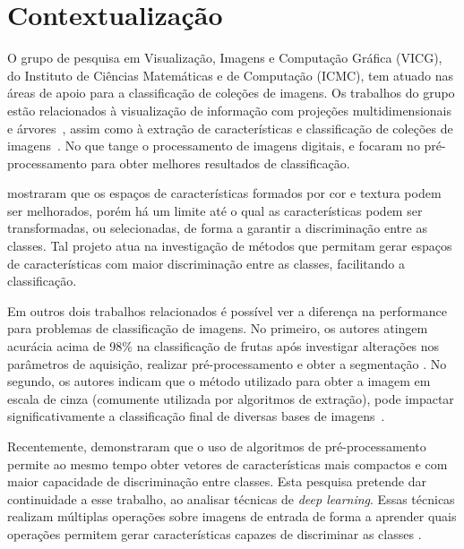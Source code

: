 \section{Contextualização}

O grupo de pesquisa em Visualização, Imagens e Computação Gráfica (VICG), do Instituto de Ciências Matemáticas e de Computação (ICMC), tem atuado nas áreas de apoio para a classificação de coleções de imagens. Os trabalhos do grupo estão relacionados à visualização de informação com projeções multidimensionais e árvores~\cite{Joia2011}, assim como à extração de características e classificação de coleções de imagens~\cite{Paiva2011}. No que tange o processamento de imagens digitais, \citet{Picon2011} e \citet{Ponti2013} focaram no pré-processamento para obter melhores resultados de classificação. 

\citet{Paiva2011} mostraram que os espaços de características formados por cor e textura podem ser melhorados, porém há um limite até o qual as características podem ser transformadas, ou selecionadas, de forma a garantir a discriminação entre as classes. Tal projeto atua na investigação de métodos que permitam gerar espaços de características com maior discriminação entre as classes, facilitando a classificação. 

Em outros dois trabalhos relacionados é possível ver a diferença na performance para problemas de classificação de imagens. No primeiro, os autores atingem acurácia acima de 98\% na classificação de frutas após investigar alterações nos parâmetros de aquisição, realizar pré-processamento e obter a segmentação \cite{Rocha2010}. No segundo, os autores indicam que o método utilizado para obter a imagem em escala de cinza (comumente utilizada por algoritmos de extração), pode impactar significativamente a classificação final de diversas bases de imagens~\cite{Kanan2012}.

Recentemente, \citet{Ponti2014} demonstraram que o uso de algoritmos de pré\hyp{}processamento permite ao mesmo tempo obter vetores de características mais compactos e com maior capacidade de discriminação entre classes. Esta pesquisa pretende dar continuidade a esse trabalho, ao analisar técnicas de \textit{deep learning}. Essas técnicas realizam múltiplas operações sobre imagens de entrada de forma a aprender quais operações permitem gerar características capazes de discriminar as classes \cite{bengio2009}.



